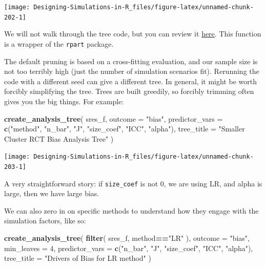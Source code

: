 \documentclass[
]{book}
\newenvironment{Shaded}{\begin{snugshade}}{\end{snugshade}}
\newcommand{\AttributeTok}[1]{\textcolor[rgb]{0.13,0.29,0.53}{#1}}
\newcommand{\DecValTok}[1]{\textcolor[rgb]{0.00,0.00,0.81}{#1}}
\newcommand{\FunctionTok}[1]{\textcolor[rgb]{0.13,0.29,0.53}{\textbf{#1}}}
\newcommand{\NormalTok}[1]{#1}
\newcommand{\SpecialCharTok}[1]{\textcolor[rgb]{0.81,0.36,0.00}{\textbf{#1}}}
\newcommand{\StringTok}[1]{\textcolor[rgb]{0.31,0.60,0.02}{#1}}
\begin{document}
\begin{center}\texttt{[image: Designing-Simulations-in-R\_files/figure-latex/unnamed-chunk-202-1]} \end{center}

We will not walk through the tree code, but you can review it \href{code/create_analysis_tree.R}{here}.
This function is a wrapper of the \texttt{rpart} package.

The default pruning is based on a cross-fitting evaluation, and our sample size is not too terribly high (just the number of simulation scenarios fit).
Rerunning the code with a different seed can give a different tree.
In general, it might be worth forcibly simplifying the tree.
Trees are built greedily, so forcibly trimming often gives you the big things.
For example:

\begin{Shaded}
\begin{Highlighting}[]
\FunctionTok{create\_analysis\_tree}\NormalTok{( sres\_f,}
                      \AttributeTok{outcome =} \StringTok{"bias"}\NormalTok{,}
                      \AttributeTok{predictor\_vars =} \FunctionTok{c}\NormalTok{(}\StringTok{"method"}\NormalTok{, }\StringTok{"n\_bar"}\NormalTok{, }\StringTok{"J"}\NormalTok{,}
                                         \StringTok{"size\_coef"}\NormalTok{, }\StringTok{"ICC"}\NormalTok{, }\StringTok{"alpha"}\NormalTok{),}
                      \AttributeTok{tree\_title =} \StringTok{"Smaller Cluster RCT Bias Analysis Tree"}\NormalTok{ )}
\end{Highlighting}
\end{Shaded}

\begin{center}\texttt{[image: Designing-Simulations-in-R\_files/figure-latex/unnamed-chunk-203-1]} \end{center}

A very straightforward story: if \texttt{size\_coef} is not 0, we are using LR, and alpha is large, then we have large bias.

We can also zero in on specific methods to understand how they engage with the simulation factors, like so:

\begin{Shaded}
\begin{Highlighting}[]
\FunctionTok{create\_analysis\_tree}\NormalTok{( }\FunctionTok{filter}\NormalTok{( sres\_f, method}\SpecialCharTok{==}\StringTok{"LR"}\NormalTok{ ),}
                      \AttributeTok{outcome =} \StringTok{"bias"}\NormalTok{,}
                      \AttributeTok{min\_leaves =} \DecValTok{4}\NormalTok{,}
                      \AttributeTok{predictor\_vars =} \FunctionTok{c}\NormalTok{(}\StringTok{"n\_bar"}\NormalTok{, }\StringTok{"J"}\NormalTok{,}
                                         \StringTok{"size\_coef"}\NormalTok{, }\StringTok{"ICC"}\NormalTok{, }\StringTok{"alpha"}\NormalTok{),}
                      \AttributeTok{tree\_title =} \StringTok{"Drivers of Bias for LR method"}\NormalTok{ )}
\end{Highlighting}
\end{Shaded}
\end{document}

